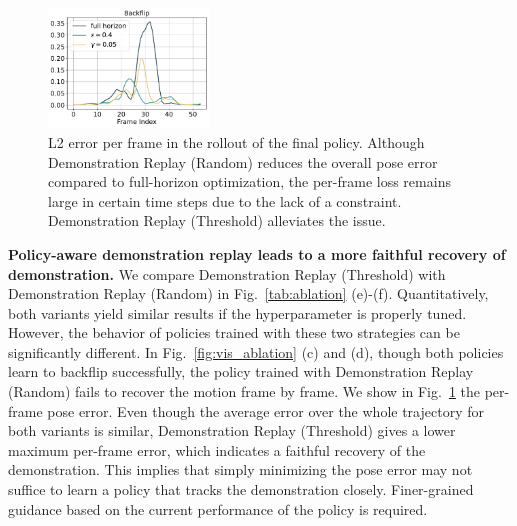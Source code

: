 \begin{figure}
     \centering
     \vspace{-10pt}
     \centering
     \includegraphics[width=0.38\textwidth]{figures/frame_backflip.pdf}
    \caption{L2 error per frame in the rollout of the final policy. Although Demonstration Replay (Random) reduces the overall pose error compared to full-horizon optimization, the per-frame loss remains large in certain time steps due to the lack of a constraint. Demonstration Replay (Threshold) alleviates the issue.}
    \label{fig:frame_loss}
\end{figure}
\textbf{Policy-aware demonstration replay leads to a more faithful recovery of demonstration.} 
We compare Demonstration Replay (Threshold) with Demonstration Replay (Random) in Fig.~\ref{tab:ablation} (e)-(f). Quantitatively, both variants yield similar results if the hyperparameter is properly tuned. However, the behavior of policies trained with these two strategies can be significantly different. In Fig.~\ref{fig:vis_ablation} (c) and (d), though both policies learn to backflip successfully, the policy trained with Demonstration Replay (Random) fails to recover the motion frame by frame. 
We show in Fig.~\ref{fig:frame_loss} the per-frame pose error. Even though the average error over the whole trajectory for both variants is similar, Demonstration Replay (Threshold) gives a lower maximum per-frame error, which indicates a faithful recovery of the demonstration. This implies that simply minimizing the pose error may not suffice to learn a policy that tracks the demonstration closely. Finer-grained guidance based on the current performance of the policy is required. 

















